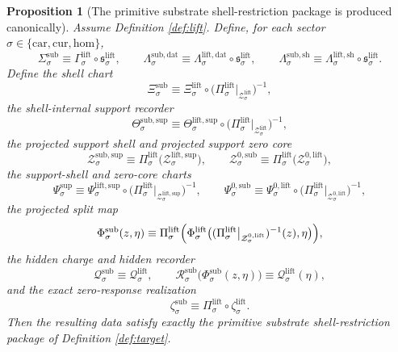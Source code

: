 \documentclass[11pt]{article}
\newcommand{\Car}{\mathrm{car}}
\newcommand{\Cur}{\mathrm{cur}}
\newcommand{\Hom}{\mathrm{hom}}
\newcommand{\SubSection}[1]{\Sigma_{#1}^{\mathrm{sub}}}
\newcommand{\SubData}[1]{\Lambda_{#1}^{\mathrm{sub,dat}}}
\newcommand{\SubShellMap}[1]{\Lambda_{#1}^{\mathrm{sub,sh}}}
\newcommand{\SubChart}[1]{\Xi_{#1}^{\mathrm{sub}}}
\newcommand{\SubSupport}[1]{\Theta_{#1}^{\mathrm{sub,sup}}}
\newcommand{\SubSupportShell}[1]{\mathcal Z_{#1}^{\mathrm{sub,sup}}}
\newcommand{\SubZeroCore}[1]{\mathcal Z_{#1}^{0,\mathrm{sub}}}
\newcommand{\ShellChart}[1]{\Psi_{#1}^{\mathrm{sup}}}
\newcommand{\SubZeroChart}[1]{\Psi_{#1}^{0,\mathrm{sub}}}
\newcommand{\SubSplit}[1]{\Phi_{#1}^{\mathrm{sub}}}
\newcommand{\SubCharge}[1]{\mathcal Q_{#1}^{\mathrm{sub}}}
\newcommand{\SubResidual}[1]{\mathcal R_{#1}^{\mathrm{sub}}}
\newcommand{\SubEmbed}[1]{\zeta_{#1}^{\mathrm{sub}}}
\newcommand{\LiftProj}[1]{\Pi_{#1}^{\mathrm{lift}}}
\newcommand{\LiftSelect}[1]{\mathfrak s_{#1}^{\mathrm{lift}}}
\newcommand{\LiftSection}[1]{\Gamma_{#1}^{\mathrm{lift}}}
\newcommand{\LiftData}[1]{\Lambda_{#1}^{\mathrm{lift,dat}}}
\newcommand{\LiftShellMap}[1]{\Lambda_{#1}^{\mathrm{lift,sh}}}
\newcommand{\LiftShellSet}[1]{\mathcal Z_{#1}^{\mathrm{lift}}}
\newcommand{\LiftChart}[1]{\Xi_{#1}^{\mathrm{lift}}}
\newcommand{\LiftSupport}[1]{\Theta_{#1}^{\mathrm{lift,sup}}}
\newcommand{\LiftSupportShell}[1]{\mathcal Z_{#1}^{\mathrm{lift,sup}}}
\newcommand{\LiftZeroCore}[1]{\mathcal Z_{#1}^{0,\mathrm{lift}}}
\newcommand{\LiftEqChart}[1]{\Psi_{#1}^{\mathrm{lift,sup}}}
\newcommand{\LiftZeroChart}[1]{\Psi_{#1}^{0,\mathrm{lift}}}
\newcommand{\LiftSplit}[1]{\Phi_{#1}^{\mathrm{lift}}}
\newcommand{\LiftCharge}[1]{\mathcal Q_{#1}^{\mathrm{lift}}}
\newcommand{\LiftEmbed}[1]{\zeta_{#1}^{\mathrm{lift}}}
\newtheorem{proposition}{Proposition}
\begin{document}
\begin{proposition}[The primitive substrate shell-restriction package is produced canonically]
\label{prop:target}
Assume Definition \ref{def:lift}. Define, for each sector \(\sigma\in\{\Car,\Cur,\Hom\}\),
\begin{equation}
\SubSection{\sigma}
\equiv
\LiftSection{\sigma}\circ\LiftSelect{\sigma},
\qquad
\SubData{\sigma}
\equiv
\LiftData{\sigma}\circ\LiftSelect{\sigma},
\qquad
\SubShellMap{\sigma}
\equiv
\LiftShellMap{\sigma}\circ\LiftSelect{\sigma}.
\label{eq:inducedsections}
\end{equation}
Define the shell chart
\begin{equation}
\SubChart{\sigma}
\equiv
\LiftChart{\sigma}\circ
\bigl(\LiftProj{\sigma}\big|_{\LiftShellSet{\sigma}}\bigr)^{-1},
\label{eq:inducedsubchart}
\end{equation}
the shell-internal support recorder
\begin{equation}
\SubSupport{\sigma}
\equiv
\LiftSupport{\sigma}\circ
\bigl(\LiftProj{\sigma}\big|_{\LiftShellSet{\sigma}}\bigr)^{-1},
\label{eq:inducedsupport}
\end{equation}
the projected support shell and projected support zero core
\begin{equation}
\SubSupportShell{\sigma}
\equiv
\LiftProj{\sigma}\bigl(\LiftSupportShell{\sigma}\bigr),
\qquad
\SubZeroCore{\sigma}
\equiv
\LiftProj{\sigma}\bigl(\LiftZeroCore{\sigma}\bigr),
\label{eq:inducedshells}
\end{equation}
the support-shell and zero-core charts
\begin{equation}
\ShellChart{\sigma}
\equiv
\LiftEqChart{\sigma}\circ
\bigl(\LiftProj{\sigma}\big|_{\LiftSupportShell{\sigma}}\bigr)^{-1},
\qquad
\SubZeroChart{\sigma}
\equiv
\LiftZeroChart{\sigma}\circ
\bigl(\LiftProj{\sigma}\big|_{\LiftZeroCore{\sigma}}\bigr)^{-1},
\label{eq:inducedcharts}
\end{equation}
the projected split map
\begin{equation}
\SubSplit{\sigma}(z,\eta)
\equiv
\LiftProj{\sigma}\Bigl(
\LiftSplit{\sigma}\bigl(
(\LiftProj{\sigma}\big|_{\LiftZeroCore{\sigma}})^{-1}(z),
\eta
\bigr)
\Bigr),
\label{eq:inducedsplit}
\end{equation}
the hidden charge and hidden recorder
\begin{equation}
\SubCharge{\sigma}
\equiv
\LiftCharge{\sigma},
\qquad
\SubResidual{\sigma}\bigl(\SubSplit{\sigma}(z,\eta)\bigr)
\equiv
\LiftCharge{\sigma}(\eta),
\label{eq:inducedresidual}
\end{equation}
and the exact zero-response realization
\begin{equation}
\SubEmbed{\sigma}
\equiv
\LiftProj{\sigma}\circ\LiftEmbed{\sigma}.
\label{eq:inducedembed}
\end{equation}
Then the resulting data satisfy exactly the primitive substrate shell-restriction package of Definition \ref{def:target}.
\end{proposition}
\end{document}
